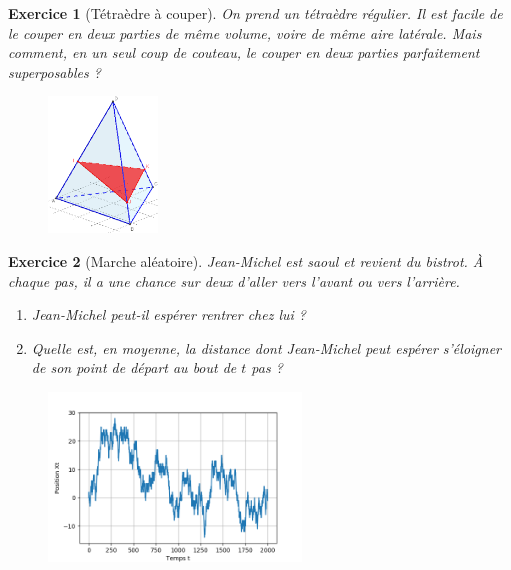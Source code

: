 \documentclass[12pt]{article}
\theoremstyle{break}
\newtheorem{exo}{Exercice}
\begin{document}
\begin{exo}[Tétraèdre à couper]
On prend un tétraèdre régulier. Il est facile de le couper en deux parties de même volume, voire de même aire latérale. Mais comment, en un seul coup de couteau, le couper en deux parties parfaitement superposables ?

\begin{figure}[h!]
	\centering
    \includegraphics[width=0.26\textwidth]{CoupeTetraedre.png}
\end{figure}
\end{exo}


\begin{exo}[Marche aléatoire]
Jean-Michel est saoul et revient du bistrot. À chaque pas, il a une chance sur deux d'aller vers l'avant ou vers l'arrière.
\begin{enumerate}
\item Jean-Michel peut-il espérer rentrer chez lui ?
\item Quelle est, en moyenne, la distance dont Jean-Michel peut espérer s'éloigner de son point de départ au bout de $t$ pas ?
\end{enumerate}

\begin{figure}[!ht]
\centering
\includegraphics[width=0.6\textwidth]{marcheJM.png}
\end{figure}

\end{exo}
\end{document}
